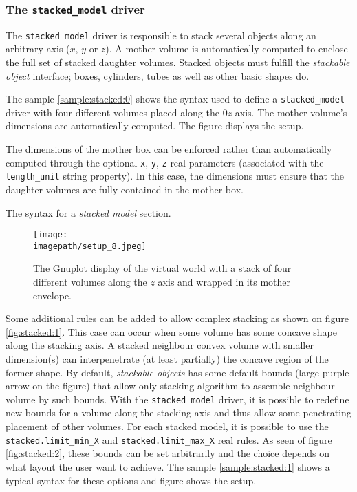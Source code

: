 \subsubsection{The \texttt{stacked\_model} driver}

The \texttt{stacked\_model} driver is responsible to stack several objects
along an arbitrary axis ($x$, $y$ or $z$). A mother volume is automatically
computed to enclose the full set of stacked daughter volumes. Stacked objects
must fulfill the \emph{stackable object} interface; boxes, cylinders,
tubes as well as other basic shapes do.

The sample  \ref{sample:stacked:0} shows the  syntax used to  define a
\texttt{stacked\_model}  driver  with  four different  volumes  placed
along the $0z$ axis.  The mother volume's dimensions are automatically
computed.  The figure \label{fig:setup_8:0} displays the setup.

The  dimensions  of  the  mother  box  can  be  enforced  rather  than
automatically  computed through  the optional  \texttt{x}, \texttt{y},
\texttt{z} real parameters  (associated with the \texttt{length\_unit}
string property).  In this case,  the dimensions must ensure  that the
daughter volumes are fully contained in the mother box.

\begin{sample}[h]
\caption{The syntax for a \emph{stacked model} section.}
\label{sample:stacked:0}
\end{sample}

\begin{figure}[h]
\begin{center}
\texttt{[image: \\imagepath/setup\_8.jpeg]}
\end{center}
\caption{The Gnuplot display of the virtual world with a stack of four
  different  volumes along  the $z$  axis  and wrapped  in its  mother
  envelope.}
\label{fig:setup_8:0}
\end{figure}


Some additional rules can be  added to allow complex stacking as shown
on figure  \ref{fig:stacked:1}. This case  can occur when  some volume
has some  concave shape along  the stacking axis. A  stacked neighbour
convex volume  with smaller dimension(s) can  interpenetrate (at least
partially)  the  concave region  of  the  former  shape.  By  default,
\emph{stackable objects}  has some default bounds  (large purple arrow
on  the  figure)  that  allow  only  stacking  algorithm  to  assemble
neighbour  volume by  such bounds.   With  the \texttt{stacked\_model}
driver, it is  possible to redefine new bounds for  a volume along the
stacking  axis and  thus  allow some  penetrating  placement of  other
volumes.   For  each  stacked  model,   it  is  possible  to  use  the
\texttt{stacked.limit\_min\_X} and \texttt{stacked.limit\_max\_X} real
rules. As seen of figure  \ref{fig:stacked:2}, these bounds can be set
arbitrarily and  the choice  depends on what  layout the user  want to
achieve. The sample \ref{sample:stacked:1}  shows a typical syntax for
these options and figure  \label{fig:setup_9:0} shows the setup.

